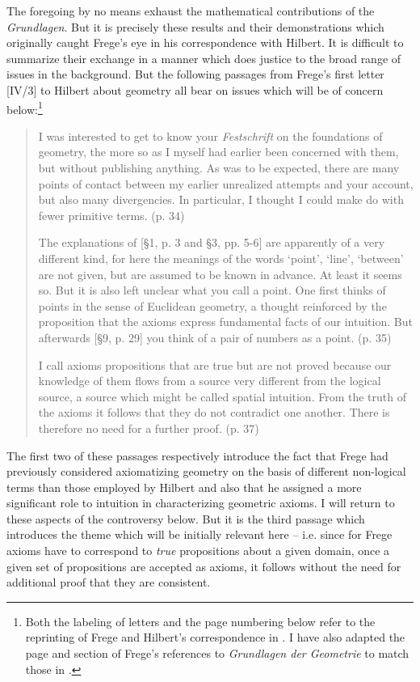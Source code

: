 \documentclass[11pt,fleqn,leqno]{article}
\begin{document}
The foregoing by no means exhaust the mathematical contributions of the \textsl{Grundlagen}.  But it is precisely these results and their demonstrations which originally caught Frege's eye in his correspondence with Hilbert. It is difficult to summarize their exchange in a manner which does justice to the broad range of issues in the background.   But the following passages from Frege's first letter [IV/3] to Hilbert about geometry all bear on issues which will be of concern below:\footnote{Both the labeling of letters and the page numbering below refer to the reprinting of Frege and Hilbert's correspondence in \citep{Frege1980a}.   I have also adapted the page and section of Frege's references to \textsl{Grundlagen der Geometrie} to match those in \citep{Hilbert1971}.}

\begin{quote}
\footnotesize{I was interested to get to know your \textsl{Festschrift} on the foundations of geometry, the more so as I myself had earlier been concerned with them, but without publishing anything. As was to be expected, there are many points of contact between my earlier unrealized attempts and your account, but also many divergencies. In particular, I thought I could make do with fewer primitive terms.  \hfill (p. 34)


The explanations of [\S 1, p. 3 and \S 3, pp. 5-6] are apparently of a very different kind, for here the meanings of the words `point', `line', `between' are not given, but are assumed to be known in advance.  At least it seems so.  But it is also left unclear what you call a point. One first thinks of points in the sense of Euclidean geometry, a thought reinforced by the proposition that the axioms express fundamental facts of our intuition.  But afterwards [\S 9, p. 29] you think of a pair of numbers as a point. \hspace*{1ex} \hfill (p. 35)

I call axioms propositions that are true but are not proved because our knowledge of them flows from a source very different from the logical source, a source which might be called spatial intuition. From the truth of the axioms it follows that they do not contradict one another. There is therefore no need for a further proof. \hfill (p. 37)} 
\end{quote}

The first two of these passages respectively introduce the fact that Frege had previously considered axiomatizing geometry on the basis of different non-logical terms than those employed by Hilbert and also that he assigned a more significant role to intuition in characterizing geometric axioms.  I will return to these aspects of the controversy below.  But it is the third passage which introduces the theme which will be initially relevant here -- i.e. since for Frege axioms have to correspond to \textsl{true} propositions about a given domain, once a given set of propositions are accepted as axioms, it follows without the need for additional proof that they are consistent.   
\end{document}
